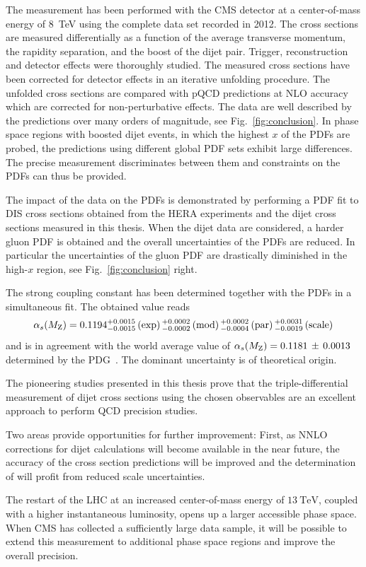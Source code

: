 The measurement has been performed with the CMS detector at a center-of-mass
energy of \SI{8}{\TeV} using the complete data set recorded in 2012. The cross
sections are measured differentially as a function of the average transverse
momentum, the rapidity separation, and the boost of the dijet pair. Trigger,
reconstruction and detector effects were thoroughly studied. The measured cross
sections have been corrected for detector effects in an iterative unfolding
procedure. The unfolded cross sections are compared with pQCD predictions at NLO
accuracy which are corrected for non-perturbative effects. The data are well
described by the predictions over many orders of magnitude, see
Fig.~\ref{fig:conclusion}. In phase space regions with boosted dijet events, in
which the highest $x$ of the PDFs are probed, the predictions using different
global PDF sets exhibit large differences. The precise measurement discriminates
between them and constraints on the PDFs can thus be provided. 

The impact of the data on the PDFs is demonstrated by performing a PDF fit to
DIS cross sections obtained from the HERA experiments and the dijet cross sections measured
in this thesis. When the dijet data are considered, a harder gluon PDF is obtained
and the overall uncertainties of the PDFs are reduced. In particular the uncertainties of
the gluon PDF are drastically diminished in the high-$x$ region, see
Fig.~\ref{fig:conclusion} right.

The strong coupling constant \asmz has been determined together with the PDFs in
a simultaneous fit. The obtained value reads
%
\begin{equation*}
    \alpha_{s}(M_\mathrm{Z}) = 0.1194_{-0.0015}^{+0.0015}\,(\mathrm{exp})\,
    {}_{-0.0002}^{+0.0002}\,(\mathrm{mod})\,{}_{-0.0004}^{+0.0002}\,(\mathrm{par})\,
    {}_{-0.0019}^{+0.0031}\,(\mathrm{scale})\,
\end{equation*}
%
and is in agreement with the world average value of $\alpha_{s}(M_\mathrm{Z}) = 0.1181 \,\pm\, 0.0013$
determined by the PDG~\cite{Agashe:2014kda}. The dominant uncertainty is of
theoretical origin.

The pioneering studies presented in this thesis prove that the triple-differential
measurement of dijet cross sections using the chosen observables are an
excellent approach to perform QCD precision studies.

Two areas provide opportunities for further improvement: First, as NNLO
corrections for dijet calculations will become available in the near future, the
accuracy of the cross section predictions will be improved and the determination
of \asmz will profit from reduced scale uncertainties. 

The restart of the LHC at an increased center-of-mass energy of $\SI{13}{\TeV}$,
coupled with a higher instantaneous luminosity, opens up a larger
accessible phase space. When CMS has collected a sufficiently large data sample,
it will be possible to extend this measurement to additional phase space regions
and improve the overall precision.

